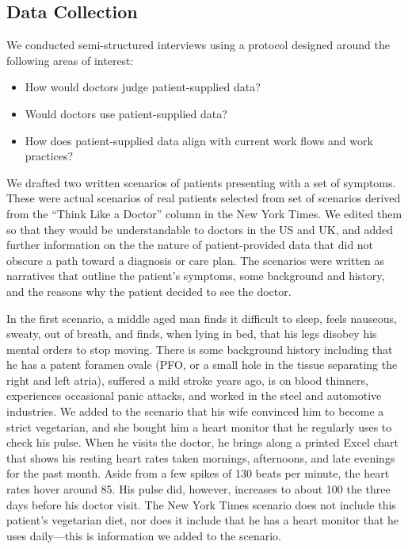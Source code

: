\documentclass{sigchi}
\begin{document}
\subsection{Data Collection}
We conducted semi-structured interviews using a protocol designed around the following areas of interest:
\begin{itemize}
\item How would doctors judge patient-supplied data?
\item Would doctors use patient-supplied data?
\item How does patient-supplied data align with current work flows and work practices?
\end{itemize}
We drafted two written scenarios of patients presenting with a set of symptoms.  These were actual scenarios of real patients selected from set of scenarios derived from the “Think Like a Doctor” column in the New York Times.  We edited them so that they would be understandable to doctors in the US and UK, and added further information on the the nature of patient-provided data that did not obscure a path toward a diagnosis or care plan.  The scenarios were written as narratives that outline the patient’s symptoms, some background and history, and the reasons why the patient decided to see the doctor.  

In the first scenario, a middle aged man finds it difficult to sleep, feels nauseous, sweaty, out of breath, and finds, when lying in bed, that his legs disobey his mental orders to stop moving.   There is some background history including that he has a patent foramen ovale (PFO, or a small hole in the tissue separating the right and left atria), suffered a mild stroke years ago, is on blood thinners, experiences occasional panic attacks, and worked in the steel and automotive industries.  We added to the scenario that his wife convinced him to become a strict vegetarian, and she bought him a heart monitor that he regularly uses to check his pulse. When he visits the doctor, he brings along a printed Excel chart that shows his resting heart rates taken mornings, afternoons, and late evenings for the past month. Aside from a few spikes of 130 beats per minute, the heart rates hover around 85.  His pulse did, however, increases to about 100 the three days before his doctor visit.  The New York Times scenario does not include this patient’s vegetarian diet, nor does it include that he has a heart monitor that he uses daily—this is information we added to the scenario.
\end{document}
